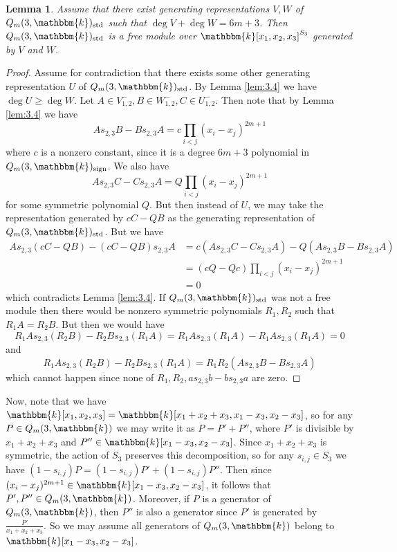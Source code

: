 \documentclass[11pt]{article}
\newtheorem{lemma}[theorem]{Lemma}
\theoremstyle{definition}
\renewcommand{\k}{\mathbbm{k}}
\newcommand{\std}{\mathrm{std}}
\newcommand{\sgn}{\mathrm{sign}}
\begin{document}
\begin{lemma}\label{lem:3.5}
    Assume that there exist generating representations $V,W$ of $Q_m(3,\k)_\std$ such that $\deg V+\deg W=6m+3$. Then $Q_m(3,\k)_\std$ is a free module over $\k[x_1,x_2,x_3]^{S_3}$ generated by $V$ and $W$.
\end{lemma}
\begin{proof}
    Assume for contradiction that there exists some other generating representation $U$ of \linebreak
    $Q_m(3,\k)_\std$. By Lemma \ref{lem:3.4} we have $\deg U\geq \deg W$. Let $A\in V_{1,2}^-,B\in W_{1,2}^-,C\in U_{1,2}^-$. Then note that by Lemma \ref{lem:3.4} we have
    $$As_{2,3}B-Bs_{2,3}A=c\prod_{i<j}(x_i-x_j)^{2m+1}$$ 
    where $c$ is a nonzero constant, since it is a degree $6m+3$ polynomial in $Q_m(3,\k)_\sgn$. We also have
    $$As_{2,3}C-Cs_{2,3}A=Q\prod_{i<j}(x_i-x_j)^{2m+1}$$
    for some symmetric polynomial $Q$. But then instead of $U$, we may take the representation generated by $cC-QB$ as the generating representation of $Q_m(3,\k)_\std$. But we have
    \begin{align*}
        As_{2,3}(cC-QB)-(cC-QB)s_{2,3}A&=c(As_{2,3}C-Cs_{2,3}A)-Q(As_{2,3}B-Bs_{2,3}A)\\
        &=(cQ-Qc)\prod_{i<j}(x_i-x_j)^{2m+1}\\
        &=0
    \end{align*}
    which contradicts Lemma \ref{lem:3.4}. If $Q_m(3,\k)_\std$ was not a free module then there would be nonzero symmetric polynomials $R_1,R_2$ such that $R_1A=R_2B$. But then we would have 
    $$R_1As_{2,3}(R_2B)-R_2Bs_{2,3}(R_1A)=R_1As_{2,3}(R_1A)-R_1As_{2,3}(R_1A)=0$$
    and 
    $$R_1As_{2,3}(R_2B)-R_2Bs_{2,3}(R_1A)=R_1R_2(As_{2,3}B-Bs_{2,3}A)$$
    which cannot happen since none of $R_1,R_2,as_{2,3}b-bs_{2,3}a$ are zero.
\end{proof}

Now, note that we have $\k[x_1,x_2,x_3]=\k[x_1+x_2+x_3,x_1-x_3,x_2-x_3]$, so for any $P\in Q_m(3,\k)$ we may write it as $P=P'+P''$, where $P'$ is divisible by $x_1+x_2+x_3$ and $P''\in\k[x_1-x_3,x_2-x_3]$. Since $x_1+x_2+x_3$ is symmetric, the action of $S_3$ preserves this decomposition, so for any $s_{i,j}\in S_3$ we have $(1-s_{i,j})P=(1-s_{i,j})P'+(1-s_{i,j})P''$. Then since $(x_i-x_j)^{2m+1}\in\k[x_1-x_3,x_2-x_3]$, it follows that $P',P''\in Q_m(3,\k)$. Moreover, if $P$ is a generator of $Q_m(3,\k)$, then $P''$ is also a generator since $P'$ is generated by $\frac{P'}{x_1+x_2+x_3}$. So we may assume all generators of $Q_m(3,\k)$ belong to $\k[x_1-x_3,x_2-x_3]$. 
\end{document}
